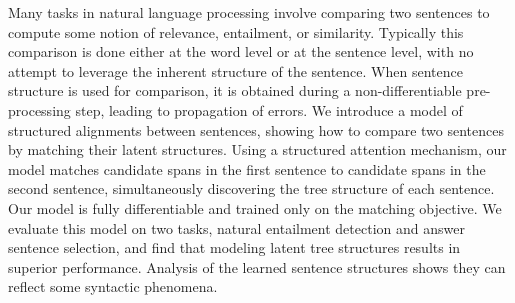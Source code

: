 Many tasks in natural language processing involve comparing two sentences to compute some notion of relevance, entailment, or similarity.  Typically this comparison is done either at the word level or at the sentence level, with no attempt to leverage the inherent structure of the sentence.   When sentence structure is used for comparison, it is obtained during a non-differentiable pre-processing step, leading to propagation of errors.  We introduce a model of structured alignments between sentences, showing how to compare two sentences by matching their latent structures.  Using a structured attention mechanism, our model matches candidate spans in the first sentence to candidate spans in the second sentence, simultaneously discovering the tree structure of each sentence. Our model  is fully differentiable and trained only on the matching objective. We evaluate this model on two  tasks, natural  entailment detection and answer sentence selection, and find that modeling latent tree structures results in superior performance. Analysis of the  learned sentence structures  shows they can reflect some syntactic phenomena.
